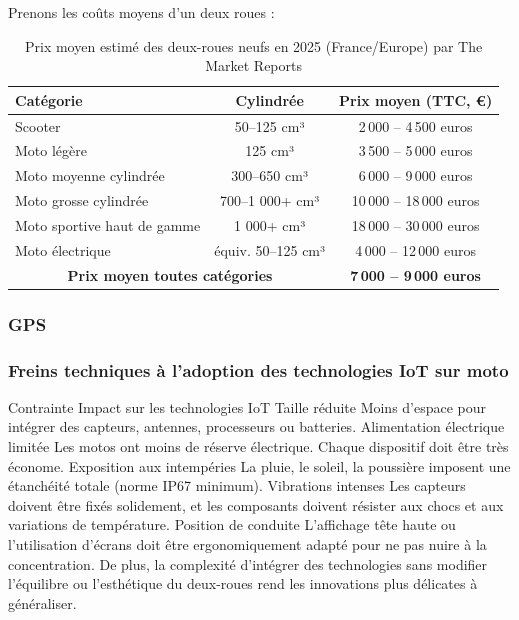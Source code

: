 Prenons les coûts moyens d'un deux roues :\\
\begin{table}[ht]
\centering
\begin{tabular}{|l|c|c|}
\hline
\textbf{Catégorie} & \textbf{Cylindrée} & \textbf{Prix moyen (TTC, €)} \\
\hline
Scooter & 50--125 cm³ & 2\,000 -- 4\,500 euros \\
Moto légère & 125 cm³ & 3\,500 -- 5\,000 euros \\
Moto moyenne cylindrée & 300--650 cm³ & 6\,000 -- 9\,000 euros \\
Moto grosse cylindrée & 700--1 000+ cm³ & 10\,000 -- 18\,000 euros \\
Moto sportive haut de gamme & 1 000+ cm³ & 18\,000 -- 30\,000 euros \\
Moto électrique & équiv. 50--125 cm³ & 4\,000 -- 12\,000 euros \\
\hline
\multicolumn{2}{|c|}{\textbf{Prix moyen toutes catégories}} & \textbf{7\,000 -- 9\,000 euros} \\
\hline
\end{tabular}
\caption{Prix moyen estimé des deux-roues neufs en 2025 (France/Europe) par The Market Reports}
\end{table}

\subsubsection{GPS}

\subsubsection{ Freins techniques à l’adoption des technologies IoT sur moto}
Contrainte	Impact sur les technologies IoT
Taille réduite	Moins d’espace pour intégrer des capteurs, antennes, processeurs ou batteries.
Alimentation électrique limitée	Les motos ont moins de réserve électrique. Chaque dispositif doit être très économe.
Exposition aux intempéries	La pluie, le soleil, la poussière imposent une étanchéité totale (norme IP67 minimum).
Vibrations intenses	Les capteurs doivent être fixés solidement, et les composants doivent résister aux chocs et aux variations de température.
Position de conduite	L’affichage tête haute ou l’utilisation d’écrans doit être ergonomiquement adapté pour ne pas nuire à la concentration.
De plus, la complexité d’intégrer des technologies sans modifier l’équilibre ou l’esthétique du deux-roues rend les innovations plus délicates à généraliser.


